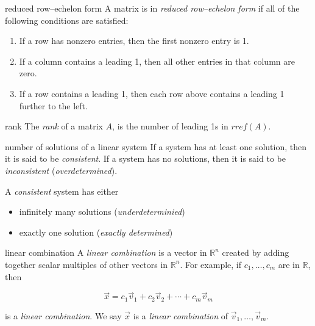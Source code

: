 \documentclass[avery5371,grid,letterpaper]{flashcards}
\newcommand{\R}{\mathbb{R}}
\newcommand{\Rn}{\mathbb{R}^{n}}
\begin{document}

\begin{flashcard}[Definition]{reduced row--echelon form}
A matrix is in \textit{reduced row--echelon form} if all of the
following conditions are satisfied:
\begin{enumerate}
\item If a row has nonzero entries, then the first nonzero entry is 1.
\item If a column contains a leading 1, then all other entries in that
column are zero.
\item If a row contains a leading 1, then each row above contains a
leading 1 further to the left.
\end{enumerate}
\end{flashcard}

\begin{flashcard}[Definition]{rank}
The \textit{rank} of a matrix $A$, is the number of leading 1s in $rref(A)$.
\end{flashcard}

\begin{flashcard}{number of solutions of a linear system}
If a system has at least one solution, then it is said to be \textit{consistent}.
If a system has no solutions, then it is said to be \textit{inconsistent}
(\textit{overdetermined}).

\bigskip
A \textit{consistent} system has either
\begin{itemize}
\item infinitely many solutions (\textit{underdeterminied})
\item exactly one solution (\textit{exactly determined})
\end{itemize}
\end{flashcard}

\begin{flashcard}[Definition]{linear combination}
A \textit{linear combination} is a vector in $\Rn$ created by adding
together scalar multiples of other vectors in $\Rn$.  For example,
if $c_1, \ldots, c_m$ are in $\R$, then

\begin{displaymath}
\vec{x} = c_1\vec{v}_1 + c_2\vec{v}_2 + \cdots + c_m\vec{v}_m
\end{displaymath}

is a \textit{linear combination}.  We say $\vec{x}$ is
a \textit{linear combination} of $\vec{v}_1, \ldots, \vec{v}_m$.
\end{flashcard}
\end{document}
